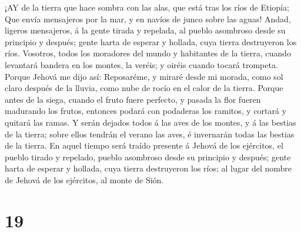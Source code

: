  ¡AY de la tierra que hace sombra con las alas, que está
tras los ríos de Etiopía;  Que envía mensajeros por la mar,
y en navíos de junco sobre las aguas! Andad, ligeros mensajeros, á la
gente tirada y repelada, al pueblo asombroso desde su principio y
después; gente harta de esperar y hollada, cuya tierra destruyeron los
ríos.  Vosotros, todos los moradores del mundo y habitantes
de la tierra, cuando levantará bandera en los montes, la veréis; y
oiréis cuando tocará trompeta.  Porque Jehová me dijo así:
Reposaréme, y miraré desde mi morada, como sol claro después de la
lluvia, como nube de rocío en el calor de la tierra.  Porque
antes de la siega, cuando el fruto fuere perfecto, y pasada la flor
fueren madurando los frutos, entonces podará con podaderas los ramitos,
y cortará y quitará las ramas.  Y serán dejados todos á las
aves de los montes, y á las bestias de la tierra; sobre ellos tendrán el
verano las aves, é invernarán todas las bestias de la tierra.
 En aquel tiempo será traído presente á Jehová de los
ejércitos, el pueblo tirado y repelado, pueblo asombroso desde su
principio y después; gente harta de esperar y hollada, cuya tierra
destruyeron los ríos; al lugar del nombre de Jehová de los ejércitos, al
monte de Sión.

\hypertarget{section-18}{%
\section{19}\label{section-18}}

